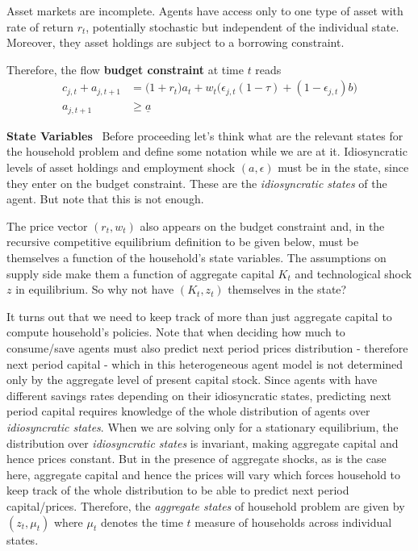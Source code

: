 \documentclass[a4paper,10pt]{article}  %
\begin{document}
Asset markets are incomplete.
Agents have access only to one type of asset with rate of return $r_t$, potentially stochastic
but independent of the individual state. Moreover, they asset holdings are subject to a borrowing constraint.


Therefore, the flow \textbf{budget constraint} at time $t$ reads
\begin{align*}
   \label{eq:budget_const}
   c_{j,t} + a_{j,t+1} & = \Big( 1 + r_t \Big) a_t + w_t \Big( \epsilon_{j,t} ( 1-\tau ) + ( 1-\epsilon_{j,t} )b \Big) \\
   a_{j,t+1}           & \ge \underline{a}
\end{align*}

\textbf{State Variables} \
Before proceeding let's think what are the relevant states for the household problem and define some notation
while we are at it.
Idiosyncratic levels of asset holdings and employment shock $ ( a, \epsilon ) $ must be in the state, since they enter
on the budget constraint. These are the \emph{idiosyncratic states} of the agent. But note that this is not enough.

The price vector $( r_t, w_t )$ also appears on the budget constraint and, in the recursive competitive equilibrium
definition to be given below, must be themselves a function of the household's state variables.
The assumptions on supply side make them a function of aggregate capital $K_t$ and technological shock $z$ in equilibrium.
So why not have $(K_t,z_t)$ themselves in the state?

It turns out that we need to keep track of more than just aggregate capital to compute household's policies.
Note that when deciding how much to consume/save agents must also predict next period prices distribution - therefore
next period capital - which in this heterogeneous agent model is not determined only by the aggregate level of present capital stock.
Since agents with have different savings rates depending on their idiosyncratic states, predicting next period capital
requires knowledge of the whole distribution of agents over \emph{idiosyncratic states}.
When we are solving only for a stationary equilibrium, the distribution over \emph{idiosyncratic states} is invariant,
making aggregate capital and hence prices constant. But in the presence of aggregate shocks, as is the case here,
aggregate capital and hence the prices will vary which forces household to keep track of the whole distribution
to be able to predict next period capital/prices.
Therefore, the \emph{aggregate states} of household problem are given by $ (z_t, \mu_t ) $ where
$ \mu_t $ denotes the time $t$ measure of households across individual states.
\end{document}
